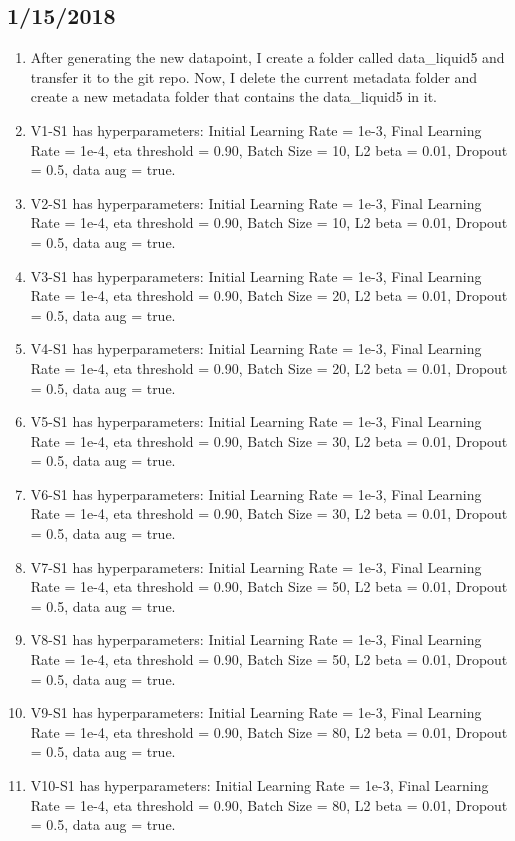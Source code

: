 \documentclass[12pt,reqno]{amsart}
\numberwithin{equation}{section}
\begin{document}
\subsection{1/15/2018}
\begin{enumerate}
\item After generating the new datapoint, I create a folder called data\_liquid5 and transfer it to the git repo.  Now, I delete the current metadata folder and create a new metadata folder that contains the data\_liquid5 in it.  
\item V1-S1 has hyperparameters:  Initial Learning Rate = 1e-3, Final Learning Rate = 1e-4, eta threshold = 0.90, Batch Size = 10, L2 beta = 0.01, Dropout = 0.5, data aug = true.
\item V2-S1 has hyperparameters:  Initial Learning Rate = 1e-3, Final Learning Rate = 1e-4, eta threshold = 0.90, Batch Size = 10, L2 beta = 0.01, Dropout = 0.5, data aug = true.    
\item V3-S1 has hyperparameters:  Initial Learning Rate = 1e-3, Final Learning Rate = 1e-4, eta threshold = 0.90, Batch Size = 20, L2 beta = 0.01, Dropout = 0.5, data aug = true.  
\item V4-S1 has hyperparameters:  Initial Learning Rate = 1e-3, Final Learning Rate = 1e-4, eta threshold = 0.90, Batch Size = 20, L2 beta = 0.01, Dropout = 0.5, data aug = true.  
\item V5-S1 has hyperparameters:  Initial Learning Rate = 1e-3, Final Learning Rate = 1e-4, eta threshold = 0.90, Batch Size = 30, L2 beta = 0.01, Dropout = 0.5, data aug = true. 
\item V6-S1 has hyperparameters:  Initial Learning Rate = 1e-3, Final Learning Rate = 1e-4, eta threshold = 0.90, Batch Size = 30, L2 beta = 0.01, Dropout = 0.5, data aug = true. 
\item V7-S1 has hyperparameters:  Initial Learning Rate = 1e-3, Final Learning Rate = 1e-4, eta threshold = 0.90, Batch Size = 50, L2 beta = 0.01, Dropout = 0.5, data aug = true. 
\item V8-S1 has hyperparameters:  Initial Learning Rate = 1e-3, Final Learning Rate = 1e-4, eta threshold = 0.90, Batch Size = 50, L2 beta = 0.01, Dropout = 0.5, data aug = true. 
\item V9-S1 has hyperparameters:  Initial Learning Rate = 1e-3, Final Learning Rate = 1e-4, eta threshold = 0.90, Batch Size = 80, L2 beta = 0.01, Dropout = 0.5, data aug = true. 
\item V10-S1 has hyperparameters:  Initial Learning Rate = 1e-3, Final Learning Rate = 1e-4, eta threshold = 0.90, Batch Size = 80, L2 beta = 0.01, Dropout = 0.5, data aug = true. 
\end{enumerate}
\end{document}
